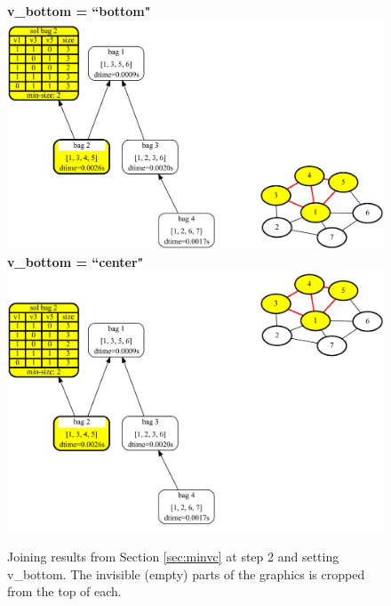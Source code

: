\documentclass[a4paper, 12pt, bibliography=totoc]{scrartcl}
\begin{document}
\begin{figure}[H]
	\centering
	\textbf{v\_bottom = ``bottom"} \vspace{1em}\\
	
	\includegraphics[width=\linewidth]{images/SVGJOIN/default_bottom2.pdf}\\
	\vspace{0.5em}
	\textbf{v\_bottom = ``center"}\\
	
	\vspace{0.6em}
	\includegraphics[width=0.9\linewidth]{images/SVGJOIN/default_center2.pdf}
	\caption[Joining results and shifting vertically to bottom and center]{Joining results from Section \ref{sec:minvc} at step 2 and setting v\_bottom. The invisible (empty) parts of the graphics is cropped from the top of each.}
	\label{fig:joinbotcenter}
\end{figure}
\end{document}
